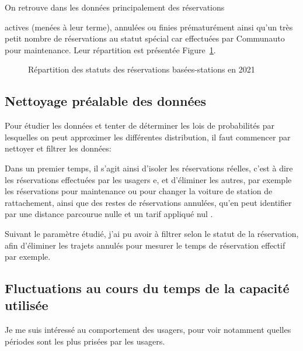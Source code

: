 \documentclass[12pt,a4paper]{article}
\newcommand{\1}[1]{\mathbbm{1}_{\{#1\}} }
\theoremstyle{definition}
\begin{document}
On retrouve dans les données principalement des réservations {actives (menées à leur terme), annulées ou finies prématurément ainsi qu'un très petit nombre de réservations au statut spécial car effectuées par Communauto pour maintenance. Leur répartition est présentée Figure~\ref{Répartition}.

\begin{figure}[!h]
\centering
{}
\caption{Répartition des statuts des réservations basées-stations en 2021}
\label{Répartition}
\end{figure}
 	
 	
\subsection{Nettoyage préalable des  données}
Pour étudier les données et tenter de déterminer les lois de probabilités par lesquelles on peut approximer les différentes distribution, il faut commencer par nettoyer et filtrer les données:

Dans un premier temps, il s'agit ainsi d'isoler les réservations réelles, c'est à dire les réservations effectuées par les usagers e, et d'éliminer les autres, par exemple les réservations pour maintenance ou pour changer la voiture de station de rattachement, ainsi que des restes de réservations annulées, qu'en peut identifier par une distance parcourue nulle et un tarif appliqué nul  .
	

Suivant le paramètre étudié, j'ai pu avoir à filtrer selon le statut de la réservation, afin d'éliminer les trajets annulés pour mesurer le temps de réservation effectif par exemple.



\subsection{Fluctuations au cours du temps de la capacité utilisée}


Je me suis intéressé au comportement des usagers, pour voir notamment quelles périodes sont les plus prisées par les usagers.

}
\end{document}
